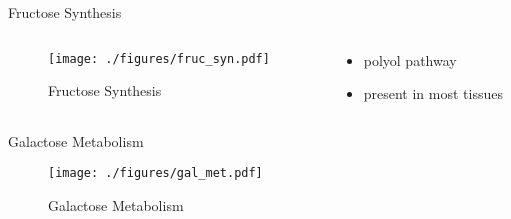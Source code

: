 \documentclass[presentation, smaller]{beamer}
\begin{document}
\begin{frame}[label={sec:org9a8f8bd}]{Fructose Synthesis}
\begin{columns}
\begin{column}{0.5\columnwidth}
\begin{figure}[htbp]
\centering
\texttt{[image: ./figures/fruc\_syn.pdf]}
\caption{\label{fig:org947155b}
Fructose Synthesis}
\end{figure}
\end{column}

\begin{column}{0.5\columnwidth}
\begin{itemize}
\item polyol pathway
\item present in most tissues
\end{itemize}
\end{column}
\end{columns}
\end{frame}

\begin{frame}[label={sec:org2328fcb}]{Galactose Metabolism}
\begin{figure}[htbp]
\centering
\texttt{[image: ./figures/gal\_met.pdf]}
\caption{\label{fig:org16dbfb8}
Galactose Metabolism}
\end{figure}
\end{frame}
\end{document}
